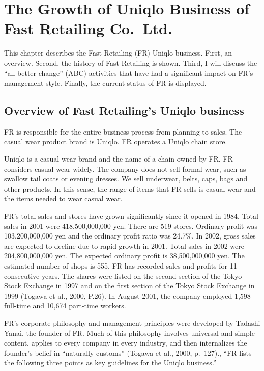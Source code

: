 \documentclass[12pt,a4paper]{article}
\begin{document}
\hypertarget{the-growth-of-uniqlo-business-of-fast-retailing-co.ltd.}{%
\section{The Growth of Uniqlo Business of Fast Retailing
Co.~Ltd.}\label{the-growth-of-uniqlo-business-of-fast-retailing-co.ltd.}}

This chapter describes the Fast Retailing (FR) Uniqlo business. First,
an overview. Second, the history of Fast Retailing is shown. Third, I
will discuss the ``all better change'' (ABC) activities that have had a
significant impact on FR's management style. Finally, the current status
of FR is displayed.

\hypertarget{overview-of-fast-retailings-uniqlo-business}{%
\subsection{Overview of Fast Retailing's Uniqlo
business}\label{overview-of-fast-retailings-uniqlo-business}}

FR is responsible for the entire business process from planning to
sales. The casual wear product brand is Uniqlo. FR operates a Uniqlo
chain store.

Uniqlo is a casual wear brand and the name of a chain owned by FR. FR
considers casual wear widely. The company does not sell formal wear,
such as swallow tail coats or evening dresses. We sell underwear, belts,
caps, bags and other products. In this sense, the range of items that FR
sells is casual wear and the items needed to wear casual wear.

FR's total sales and stores have grown significantly since it opened in
1984. Total sales in 2001 were 418,500,000,000 yen. There are 519
stores. Ordinary profit was 103,200,000,000 yen and the ordinary profit
ratio was 24.7\%. In 2002, gross sales are expected to decline due to
rapid growth in 2001. Total sales in 2002 were 204,800,000,000 yen. The
expected ordinary profit is 38,500,000,000 yen. The estimated number of
shops is 555. FR has recorded sales and profits for 11 consecutive
years. The shares were listed on the second section of the Tokyo Stock
Exchange in 1997 and on the first section of the Tokyo Stock Exchange in
1999 (Togawa et al., 2000, P.26). In August 2001, the company employed
1,598 full-time and 10,674 part-time workers.

FR's corporate philosophy and management principles were developed by
Tadashi Yanai, the founder of FR. Much of this philosophy involves
universal and simple content, applies to every company in every
industry, and then internalizes the founder's belief in ``naturally
customs'' (Togawa et al., 2000, p.~127)., ``FR lists the following three
points as key guidelines for the Uniqlo business.''
\end{document}
